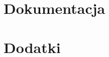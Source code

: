 \documentclass[12pt, a4paper, titleauthor, oneside]{mwrep}
\begin{document}


\part{Dokumentacja}




\appendix

\part{Dodatki}

\end{document}
